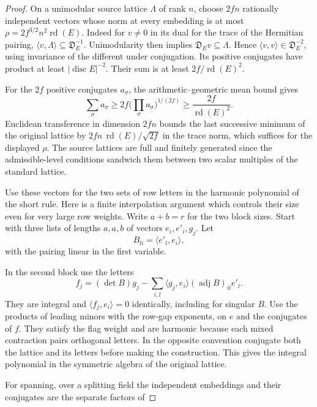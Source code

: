 \begin{proof}
On a unimodular source lattice \(\Lambda\) of rank \(n\), choose
\(2fn\) rationally independent vectors whose norm at every embedding
is at most \(\rho=2f^{3/2}n^2\operatorname{rd}(E)\).
Indeed for \(v\ne0\) in its dual for the trace of the Hermitian
pairing, \(\langle v,\Lambda\rangle\subseteq\mathfrak D_E^{-1}\).
Unimodularity then implies \(\mathfrak D_E v\subseteq\Lambda\).
Hence \(\langle v,v\rangle\in\mathfrak D_E^{-2}\), using invariance
of the different under conjugation. Its positive conjugates have
product at least \(|\operatorname{disc}E|^{-2}\). Their sum is
at least \(2f/\operatorname{rd}(E)^2\).

For the \(2f\) positive conjugates \(a_\sigma\), the arithmetic--geometric mean bound gives
\[
  \sum_\sigma a_\sigma\ge 2f\Big(\prod_\sigma a_\sigma\Big)^{1/(2f)}\ge \frac{2f}{\operatorname{rd}(E)^2}.
\]
 Euclidean transference in
dimension \(2fn\) bounds the last successive minimum of the
original lattice by \(2fn\,\operatorname{rd}(E)/\sqrt{2f}\)
in the trace norm, which suffices for the displayed \(\rho\).
The source lattices are full and finitely generated since the
admissible-level conditions sandwich them between two scalar
multiples of the standard lattice.
\cite{banaszczyk}\label{cor:slice-short-heights-1}

Use these vectors for the two sets of row letters in the harmonic
polynomial of the short rule. Here is a finite interpolation argument
which controls their size even for very large row weights. Write
\(a+b=r\) for the two block sizes. Start with three lists of lengths
\(a,a,b\) of vectors \(e_i,e'_i,g_j\). Let 
\[
  B_{li}=\langle
e'_l,e_i\rangle,
\]
 with the pairing linear in the first variable.

In the second block use the letters
\[
 f_j=(\det B)g_j-\sum_{i,l}\langle g_j,e_i\rangle
                         (\operatorname{adj}B)_{il}e'_l .
\]
They are integral and \(\langle f_j,e_i\rangle=0\) identically,
including for singular \(B\). Use the products of leading minors
with the row-gap exponents, on \(e\) and the conjugates of \(f\).
They satisfy the flag weight and are harmonic because each mixed
contraction pairs orthogonal letters. In the opposite convention
conjugate both the lattice and its letters before making the
construction. This gives the integral polynomial in the symmetric
algebra of the original lattice.

For spanning, over a splitting field the independent embeddings
and their conjugates are the separate factors of


\end{proof}
